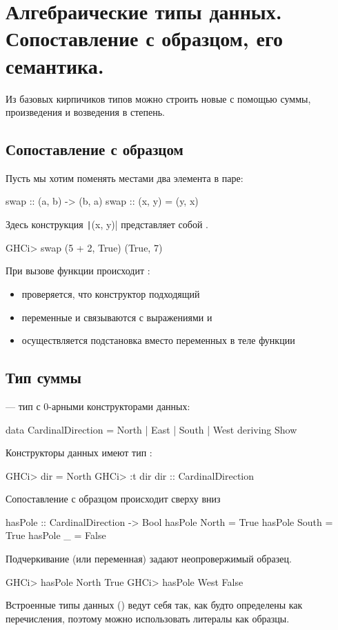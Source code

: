 \documentclass[11pt,a4paper]{article}
\begin{document}
\section{Алгебраические типы данных. Сопоставление с образцом, его семантика.}
Из базовых кирпичиков типов можно строить новые с помощью суммы, произведения и возведения в степень.							

\subsection{Сопоставление с образцом}
Пусть мы хотим поменять местами два элемента в паре:
\begin{hscode}
swap :: (a, b) -> (b, a)
swap :: (x, y) = (y, x)
\end{hscode}
Здесь конструкция \texttt|(x, y)| представляет собой .
\begin{hscode}
GHCi> swap (5 + 2, True)
(True, 7)
\end{hscode}
При вызове функции происходит :
\begin{itemize}
	\item проверяется, что конструктор \hs{(, )} подходящий
	\item переменные  и  связываются с выражениями  и 
	\item осуществляется подстановка вместо переменных в теле функции 
\end{itemize}

\subsection{Тип суммы}
 --- тип с 0-арными конструкторами данных:
\begin{hscode}
data CardinalDirection = North | East | South | West deriving Show
\end{hscode}
Конструкторы данных имеют тип :
\begin{hscode}
GHCi> dir = North
GHCi> :t dir
dir :: CardinalDirection
\end{hscode}
Сопоставление с образцом происходит сверху вниз
\begin{hscode}
hasPole :: CardinalDirection -> Bool
hasPole North = True
hasPole South = True
hasPole _ = False
\end{hscode}
Подчеркивание (или переменная) задают неопровержимый
образец.
\begin{hscode}
GHCi> hasPole North
True
GHCi> hasPole West
False
\end{hscode}
Встроенные типы данных () ведут себя так, как будто определены как перечисления, поэтому можно использовать литералы как образцы.
\end{document}
